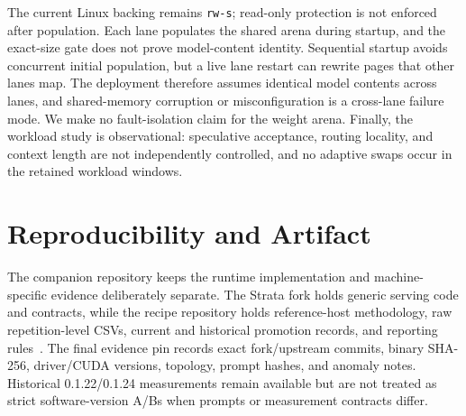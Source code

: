 The current Linux backing remains \texttt{rw-s}; read-only protection is not enforced after population. Each lane populates the shared arena during startup, and the exact-size gate does not prove model-content identity. Sequential startup avoids concurrent initial population, but a live lane restart can rewrite pages that other lanes map. The deployment therefore assumes identical model contents across lanes, and shared-memory corruption or misconfiguration is a cross-lane failure mode. We make no fault-isolation claim for the weight arena. Finally, the workload study is observational: speculative acceptance, routing locality, and context length are not independently controlled, and no adaptive swaps occur in the retained workload windows.

\section{Reproducibility and Artifact}
The companion repository keeps the runtime implementation and machine-specific evidence deliberately separate. The Strata fork holds generic serving code and contracts, while the recipe repository holds reference-host methodology, raw repetition-level CSVs, current and historical promotion records, and reporting rules~\cite{artifact}. The final evidence pin records exact fork/upstream commits, binary SHA-256, driver/CUDA versions, topology, prompt hashes, and anomaly notes. Historical 0.1.22/0.1.24 measurements remain available but are not treated as strict software-version A/Bs when prompts or measurement contracts differ.

